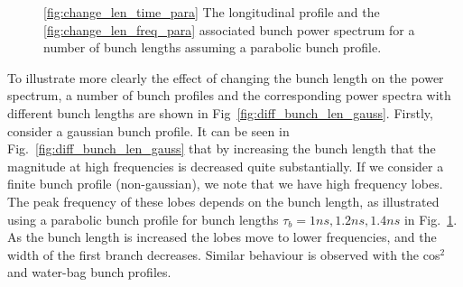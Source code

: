 \begin{figure}
\caption{\ref{fig:change_len_time_para} The longitudinal profile and the \ref{fig:change_len_freq_para} associated bunch power spectrum for a number of bunch lengths assuming a parabolic bunch profile.}
\label{fig:diff_bunch_len_para}
\end{figure}

To illustrate more clearly the effect of changing the bunch length on the power spectrum, a number of bunch profiles and the corresponding power spectra with different bunch lengths are shown in Fig~\ref{fig:diff_bunch_len_gauss}. Firstly, consider a gaussian bunch profile. It can be seen in Fig.~\ref{fig:diff_bunch_len_gauss} that by increasing the bunch length that the magnitude at high frequencies is decreased quite substantially. If we consider a finite bunch profile (non-gaussian), we note that we have high frequency lobes. The peak frequency of these lobes depends on the bunch length, as illustrated using a parabolic bunch profile for bunch lengths $\tau_{b} = 1ns, 1.2ns, 1.4ns$ in Fig.~\ref{fig:diff_bunch_len_para}. As the bunch length is increased the lobes move to lower frequencies, and the width of the first branch decreases. Similar behaviour is observed with the cos$^{2}$ and water-bag bunch profiles.

